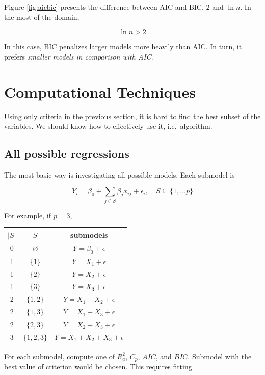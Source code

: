 \documentclass[]{book}
\theoremstyle{definition}
\theoremstyle{definition}
\theoremstyle{definition}
\theoremstyle{remark}
\begin{document}
Figure \ref{fig:aicbic} presents the difference between AIC and BIC, \(2\) and \(\ln n\). In the most of the domain,

\[\ln n > 2\]

In this case, BIC penalizes larger models more heavily than AIC. In turn, it prefers \emph{smaller models in comparison with AIC}.

\hypertarget{computational-techniques}{%
\section{Computational Techniques}\label{computational-techniques}}

Using only criteria in the previous section, it is hard to find the best subset of the variables. We should know how to effectively use it, i.e.~algorithm.

\hypertarget{all-possible-regressions}{%
\subsection{All possible regressions}\label{all-possible-regressions}}

The most basic way is investigating all possible models. Each submodel is

\begin{equation}
  Y_i = \beta_0 + \sum_{j \in S} \beta_j x_{ij} + \epsilon_i, \quad S \subseteq \{ 1, \ldots p \}
  \label{eq:bestsub}
\end{equation}

For example, if \(p = 3\),

\begin{longtable}[]{@{}ccc@{}}
\toprule
\(\lvert S \rvert\) & \(S\) & submodels\tabularnewline
\midrule
\endhead
0 & \(\varnothing\) & \(Y = \beta_0 + \epsilon\)\tabularnewline
1 & \(\{ 1 \}\) & \(Y = X_1 + \epsilon\)\tabularnewline
1 & \(\{ 2 \}\) & \(Y = X_2 + \epsilon\)\tabularnewline
1 & \(\{ 3 \}\) & \(Y = X_3 + \epsilon\)\tabularnewline
2 & \(\{ 1, 2 \}\) & \(Y = X_1 + X_2 + \epsilon\)\tabularnewline
2 & \(\{ 1, 3 \}\) & \(Y = X_1 + X_3 + \epsilon\)\tabularnewline
2 & \(\{ 2, 3 \}\) & \(Y = X_2 + X_3 + \epsilon\)\tabularnewline
3 & \(\{ 1, 2, 3 \}\) & \(Y = X_1 + X_2 + X_3 + \epsilon\)\tabularnewline
\bottomrule
\end{longtable}

For each submodel, compute one of \(R_a^2\), \(C_p\), \(AIC\), and \(BIC\). Submodel with the best value of criterion would be chosen. This requires fitting
\end{document}

